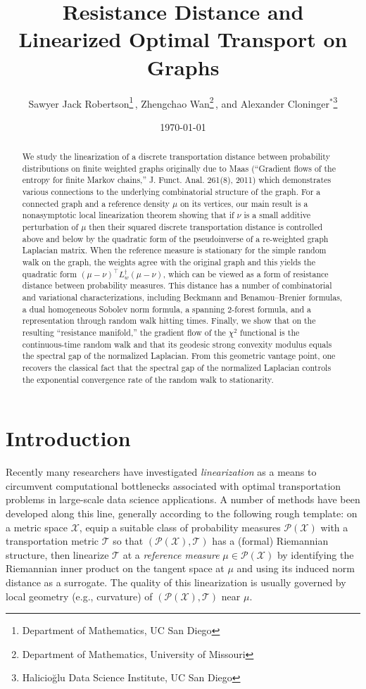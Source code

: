 \documentclass[11pt,a4paper]{article}
\title{Resistance Distance and \\ Linearized Optimal Transport on Graphs}
\author{Sawyer Jack Robertson\footnote{Department of Mathematics, UC San Diego}\,, Zhengchao Wan\footnote{Department of Mathematics, University of Missouri}\,, and Alexander Cloninger${}^\ast{}$\footnote{Halicio\u{g}lu Data Science Institute, UC San Diego}}
\date{\today}
\newcommand{\Prob}{\mathscr{P}}
\begin{document}
	
\maketitle

\vspace*{-1cm}

\begin{abstract}
    We study the linearization of a discrete transportation distance between probability distributions on finite weighted graphs originally due to Maas (``Gradient flows of the entropy for finite {M}arkov chains,'' J. Funct. Anal. 261(8), 2011) which demonstrates various connections to the underlying combinatorial structure of the graph. For a connected graph and a reference density $\mu$ on its vertices, our main result is a nonasymptotic local linearization theorem showing that if $\nu$ is a small additive perturbation of $\mu$ then their squared discrete transportation distance is controlled above and below by the quadratic form of the pseudoinverse of a re-weighted graph Laplacian matrix. When the reference measure is stationary for the simple random walk on the graph, the weights agree with the original graph and this yields the quadratic form $(\mu-\nu)^\top L_w^\dagger (\mu-\nu)$, which can be viewed as a form of resistance distance between probability measures. This distance has a number of combinatorial and variational characterizations, including Beckmann and Benamou--Brenier formulas, a dual homogeneous Sobolev norm formula, a spanning $2$-forest formula, and a representation through random walk hitting times. Finally, we show that on the resulting ``resistance manifold,'' the gradient flow of the $\chi^2$ functional is the continuous-time random walk and that its geodesic strong convexity modulus equals the spectral gap of the normalized Laplacian. From this geometric vantage point, one recovers the classical fact that the spectral gap of the normalized Laplacian controls the exponential convergence rate of the random walk to stationarity.
\end{abstract}

\section{Introduction}
Recently many researchers have investigated \emph{linearization} as a means to circumvent computational bottlenecks associated with optimal transportation problems in large-scale data science applications. A number of methods have been developed along this line, generally according to the following rough template: on a metric space $\mathcal{X}$, equip a suitable class of probability measures $\Prob(\mathcal{X})$ with a transportation metric $\mathcal{T}$ so that $(\Prob(\mathcal{X}),\mathcal{T})$ has a (formal) Riemannian structure, then linearize $\mathcal{T}$ at a \emph{reference measure} $\mu\in\Prob(\mathcal{X})$ by identifying the Riemannian inner product on the tangent space at $\mu$ and using its induced norm distance as a surrogate. The quality of this linearization is usually governed by local geometry (e.g., curvature) of $(\Prob(\mathcal{X}),\mathcal{T})$ near $\mu$. 
 
\end{document}
